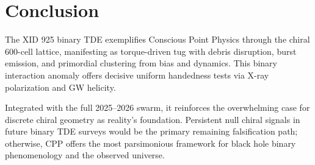 \documentclass[11pt]{article}
\begin{document}
\section{Conclusion}
The XID 925 binary TDE exemplifies Conscious Point Physics through the chiral 600-cell lattice, manifesting as torque-driven tug with debris disruption, burst emission, and primordial clustering from bias and dynamics. This binary interaction anomaly offers decisive uniform handedness tests via X-ray polarization and GW helicity.  

Integrated with the full 2025--2026 swarm, it reinforces the overwhelming case for discrete chiral geometry as reality's foundation. Persistent null chiral signals in future binary TDE surveys would be the primary remaining falsification path; otherwise, CPP offers the most parsimonious framework for black hole binary phenomenology and the observed universe.
\end{document}
